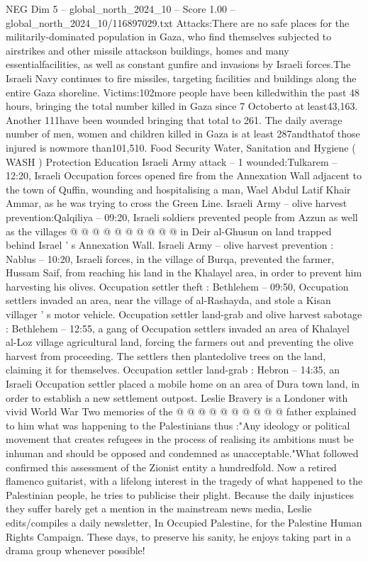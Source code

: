 \begin{textsample}{NEG Dim 5 – global\_north\_2024\_10 – Score 1.00 – global\_north\_2024\_10/116897029.txt}  \label{ex:f5_neg_044}
Attacks:There are no safe places for the militarily-dominated population in Gaza, who find themselves subjected to airstrikes and other missile attackson buildings, homes and many essentialfacilities, as well as constant gunfire and invasions by Israeli forces.The Israeli Navy continues to fire missiles, targeting facilities and buildings along the entire Gaza shoreline.
Victims:102more people have been killedwithin the past 48 hours, bringing the total number killed in Gaza since 7 Octoberto at least43,163.
Another 111have been wounded bringing that total to 261.
The daily average number of men, women and children killed in Gaza is at least 287andthatof those injured is nowmore than101,510.
Food Security Water, Sanitation and Hygiene ( WASH ) Protection Education Israeli Army attack -- 1 wounded:Tulkarem -- 12:20, Israeli Occupation forces opened fire from the Annexation Wall adjacent to the town of Quffin, wounding and hospitalising a man, Wael Abdul Latif Khair Ammar, as he was trying to cross the Green Line.
Israeli Army -- olive harvest prevention:Qalqiliya -- 09:20, Israeli soldiers prevented people from Azzun as well as the villages @ @ @ @ @ @ @ @ @ @ in Deir al-Ghusun on land trapped behind Israel ' s Annexation Wall.
Israeli Army -- olive harvest prevention : Nablus -- 10:20, Israeli forces, in the village of Burqa, prevented the farmer, Hussam Saif, from reaching his land in the Khalayel area, in order to prevent him harvesting his olives.
Occupation settler theft : Bethlehem -- 09:50, Occupation settlers invaded an area, near the village of al-Rashayda, and stole a Kisan villager ' s motor vehicle.
Occupation settler land-grab and olive harvest sabotage : Bethlehem -- 12:55, a gang of Occupation settlers invaded an area of Khalayel al-Loz village agricultural land, forcing the farmers out and preventing the olive harvest from proceeding.
The settlers then plantedolive trees on the land, claiming it for themselves.
Occupation settler land-grab : Hebron -- 14:35, an Israeli Occupation settler placed a mobile home on an area of Dura town land, in order to establish a new settlement outpost.
Leslie Bravery is a Londoner with vivid World War Two memories of the @ @ @ @ @ @ @ @ @ @ father explained to him what was happening to the Palestinians thus :"Any ideology or political movement that creates refugees in the process of realising its ambitions must be inhuman and should be opposed and condemned as unacceptable."What followed confirmed this assessment of the Zionist entity a hundredfold.
Now a retired flamenco guitarist, with a lifelong interest in the tragedy of what happened to the Palestinian people, he tries to publicise their plight.
Because the daily injustices they suffer barely get a mention in the mainstream news media, Leslie edits/compiles a daily newsletter, In Occupied Palestine, for the Palestine Human Rights Campaign.
These days, to preserve his sanity, he enjoys taking part in a drama group whenever possible!

\end{textsample}
